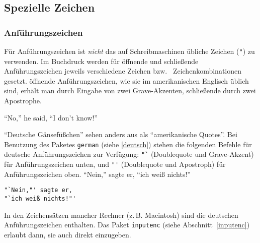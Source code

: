  

\subsection{Spezielle Zeichen} \label{spezial}
 
\subsubsection{Anführungszeichen} \label{quotes}
 
Für Anführungszeichen ist \emph{nicht} das auf Schreibmaschinen
übliche Zeichen (\verb|"|) zu verwenden.
Im Buchdruck werden für öffnende und schließende
Anführungszeichen jeweils verschiedene Zeichen bzw.\ %
Zeichenkombinationen gesetzt.
öffnende Anführungszeichen, wie sie im amerikanischen Englisch 
üblich sind, erhält man durch Eingabe von zwei Grave-Akzenten, 
schließende durch zwei Apostrophe.
\begin{LTXexample}
``No,'' he said,
``I don't know!''
\end{LTXexample}
"`Deutsche Gänsefüßchen"' sehen anders aus als ``amerikanische
Quotes''.  
Bei Benutzung des Paketes \texttt{german} (siehe \ref{deutsch})
stehen die folgenden Befehle für 
deutsche Anführungszeichen zur Verfügung:
\verb|"`| (Doublequote und Grave-Akzent) für Anführungszeichen
unten,
und
\verb|"'| (Doublequote und Apostroph) für Anführungszeichen oben.
\exa
"`Nein,"' sagte er,
"`ich weiß nichts!"'
\exb
\begin{verbatim}
"`Nein,"' sagte er,
"`ich weiß nichts!"'
\end{verbatim}
\exc
In den Zeichensätzen mancher Rechner (z.\,B. Macintosh) sind die deutschen 
Anführungszeichen enthalten.  Das Paket \texttt{inputenc} (siehe
Abschnitt~\ref{inputenc}) erlaubt dann, sie auch direkt einzugeben.

